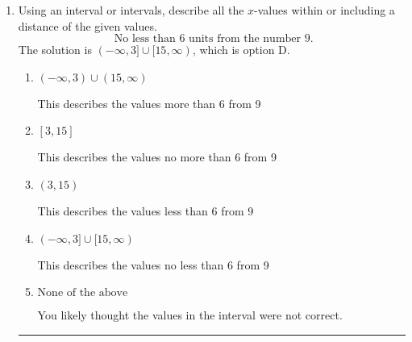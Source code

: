 \documentclass{extbook}[14pt]
\newcommand{\litem}[1]{\item #1

\rule{\textwidth}{0.4pt}}
\begin{document}
\begin{enumerate}
{\begin{enumerate}[label=\Alph*.]
* $(-3.095, \infty)$, which is the correct option.
\item \( (-\infty, a), \text{ where } a \in [-3.75, 0.75] \)

 $(-\infty, -3.095)$, which corresponds to switching the direction of the interval. You likely did this if you did not flip the inequality when dividing by a negative!
\item \( (-\infty, a), \text{ where } a \in [1.5, 6] \)

 $(-\infty, 3.095)$, which corresponds to switching the direction of the interval AND negating the endpoint. You likely did this if you did not flip the inequality when dividing by a negative as well as not moving values over to a side properly.
\item \( (a, \infty), \text{ where } a \in [3, 5.25] \)

 $(3.095, \infty)$, which corresponds to negating the endpoint of the solution.
\item \( \text{None of the above}. \)

You may have chosen this if you thought the inequality did not match the ends of the intervals.
\end{enumerate}

\textbf{General Comment:} Remember that less/greater than or equal to includes the endpoint, while less/greater do not. Also, remember that you need to flip the inequality when you multiply or divide by a negative.
}
\litem{
Using an interval or intervals, describe all the $x$-values within or including a distance of the given values.
\[ \text{ No less than } 6 \text{ units from the number } 9. \]The solution is \( (-\infty, 3] \cup [15, \infty) \), which is option D.\begin{enumerate}[label=\Alph*.]
\item \( (-\infty, 3) \cup (15, \infty) \)

This describes the values more than 6 from 9
\item \( [3, 15] \)

This describes the values no more than 6 from 9
\item \( (3, 15) \)

This describes the values less than 6 from 9
\item \( (-\infty, 3] \cup [15, \infty) \)

This describes the values no less than 6 from 9
\item \( \text{None of the above} \)

You likely thought the values in the interval were not correct.
\end{enumerate}

}
\end{enumerate}
\end{document}
